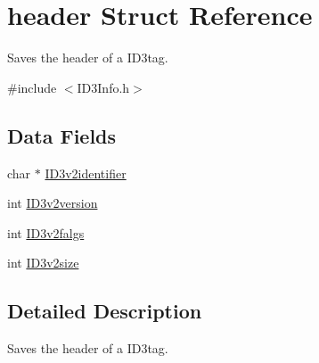 \hypertarget{structheader}{\section{header Struct Reference}
\label{structheader}
}


Saves the header of a I\-D3tag.  




{\ttfamily \#include $<$I\-D3\-Info.\-h$>$}

\subsection*{Data Fields}
\begin{DoxyCompactItemize}
\item 
char $\ast$ \hyperlink{structheader_ad055af347bd7da11f6d4faab7420becb}{I\-D3v2identifier}
\item 
int \hyperlink{structheader_a6fe87d13c59018fdf8268af1b7a36689}{I\-D3v2version}
\item 
int \hyperlink{structheader_a0a2e62855873b0bf76c06f7879920b8f}{I\-D3v2falgs}
\item 
int \hyperlink{structheader_a3c23bce3d043610e2574a51785451862}{I\-D3v2size}
\end{DoxyCompactItemize}


\subsection{Detailed Description}
Saves the header of a I\-D3tag. 

